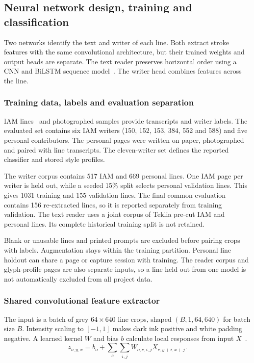 \subsection{Neural network design, training and classification}
\label{sec:des-class}
Two networks identify the text and writer of each line. Both extract stroke features with the same convolutional architecture, but their trained weights and output heads are separate. The text reader preserves horizontal order using a CNN and BiLSTM sequence model~\cite[pp.~4--5]{kizilirmak2023}. The writer head combines features across the line.

\subsubsection{Training data, labels and evaluation separation}
IAM lines~\cite{marti2002} and photographed samples provide transcripts and writer labels. The evaluated set contains six IAM writers (150, 152, 153, 384, 552 and 588) and five personal contributors. The personal pages were written on paper, photographed and paired with line transcripts. The eleven-writer set defines the reported classifier and stored style profiles.

The writer corpus contains 517 IAM and 669 personal lines. One IAM page per writer is held out, while a seeded 15\% split selects personal validation lines. This gives 1031 training and 155 validation lines. The final common evaluation contains 156 re-extracted lines, so it is reported separately from training validation. The text reader uses a joint corpus of Teklia pre-cut IAM and personal lines. Its complete historical training split is not retained.

Blank or unusable lines and printed prompts are excluded before pairing crops with labels. Augmentation stays within the training partition. Personal line holdout can share a page or capture session with training. The reader corpus and glyph-profile pages are also separate inputs, so a line held out from one model is not automatically excluded from all project data.

\subsubsection{Shared convolutional feature extractor}
The input is a batch of grey $64\times640$ line crops, shaped $(B,1,64,640)$ for batch size $B$. Intensity scaling to $[-1,1]$ makes dark ink positive and white padding negative. A learned kernel $W$ and bias $b$ calculate local responses from input $X$~\cite[pp.~6--8]{lecun1998}.
\begin{equation}
z_{o,y,x}=b_o+\sum_c\sum_{i,j}W_{o,c,i,j}X_{c,y+i,x+j}.
\label{eq:des-conv}
\end{equation}


